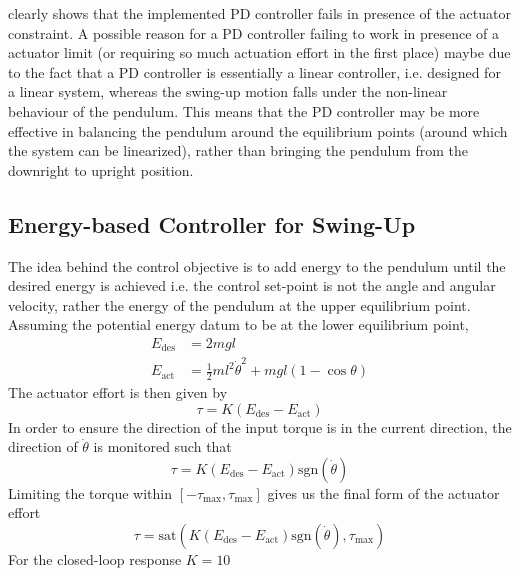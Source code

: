  clearly shows that the implemented PD controller fails in presence of the actuator constraint. A possible reason for a PD controller failing to work in presence of a actuator limit (or requiring so much actuation effort in the first place) maybe due to the fact that a PD controller is essentially a linear controller, i.e. designed for a linear system, whereas the swing-up motion falls under the non-linear behaviour of the pendulum. This means that the PD controller may be more effective in balancing the pendulum around the equilibrium points (around which the system can be linearized), rather than bringing the pendulum from the downright to upright position.

\subsection{Energy-based Controller for Swing-Up}
The idea behind the control objective is to add energy to the pendulum until the desired energy is achieved i.e. the control set-point is not the angle and angular velocity, rather the energy of the pendulum at the upper equilibrium point. Assuming the potential energy datum to be at the lower equilibrium point,
\begin{align*}
	E_{\text{des}} &= 2mgl\\
	E_{\text{act}} &= \frac{1}{2}ml^2\dot{\theta}^2 + mgl\left(1 - \cos\theta\right)
\end{align*}
The actuator effort is then given by
\begin{equation*}
	\tau = K\left(E_{\text{des}} - E_{\text{act}}\right)
\end{equation*}
In order to ensure the direction of the input torque is in the current direction, the direction of $\dot{\theta}$ is monitored such that
\begin{equation*}
	\tau = K\left(E_{\text{des}} - E_{\text{act}}\right)\text{sgn}\left(\dot{\theta}\right)
\end{equation*}
Limiting the torque within $\left[-\tau_{\text{max}},\tau_{\text{max}}\right]$ gives us the final form of the actuator effort
\begin{equation*}
	\tau = \text{sat}\left(K\left(E_{\text{des}} - E_{\text{act}}\right)\text{sgn}\left(\dot{\theta}\right),\tau_{\text{max}}\right)
\end{equation*}
For the closed-loop response $K = 10$

